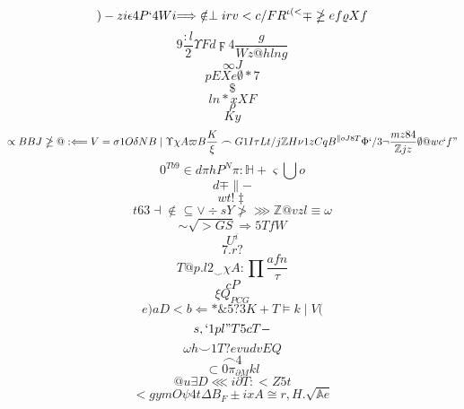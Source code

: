 \documentclass[12pt]{article}
\begin{document}
        \begin{minipage}[t][0pt]{\linewidth}

        \[)-zi\epsilon 4 P ` 4 W i {\Longrightarrow}\notin\perp i r v < c / F R^{\iota ( <}\mp\ngeq e f\varrho X f\]
\[9\frac{:l}{2}\Upsilon F d\digamma 4\frac{g}{Wz@hlng}\]
\[\infty J\]
\[pEXe\emptyset * 7\]
\[\$\]
\[ln*xXF\]
\[\rho\]
\[Ky\]
\[\propto B B J\ngeq @ :\Longleftarrow V =\sigma 1 O\delta N B\mid\Upsilon\chi A\varpi B\frac{K}{\xi}\frown G 1 I\tau L t / j\mathbb{Z} H\nu 1 z C q B^{\parallel o J 8 T}\Phi ` / 3\neg\frac{mz84}{\mathbb{Z} j z}\emptyset @ w c ` f "\]
\[0^{Tb9}\in d\pi h P^{N}\pi :\mathbb{H} +\varsigma\bigcup o\]
\[d\mp\parallel -\]
\[wt!\ddagger\]
\[t63\dashv\notin\subseteq {\lor}\div s Y\ngtr\ggg\mathbb{Z} @ v {zl}\equiv\omega\]
\[\sim\sqrt{>GS}\Longrightarrow 5 {TfW}\]
\[U^{i}\]
\[7.r?\]
\[T@p.l2_{\smile}\chi A :\prod\frac{afn}{\tau}\]
\[cP\]
\[\xi Q_{PCG}\]
\[e)aD<b\Leftarrow *\& 5 ? 3 K + T\models k\mid V (\]
\[s,`1p {l"T5cT-}\]
\[\omega h\smile 1 {T?evud}vEQ\]
\[\frown 4\]
\[\subset 0\pi_{\partial M} k l\]
\[@u\exists D\lll i\partial T : < Z 5 {t}\]
\[<gymO\psi 4 t\Delta B_{F}\pm i x A\cong r , H .\sqrt{\mathbb{A} e}
        \]
\end{minipage}
\end{document}
